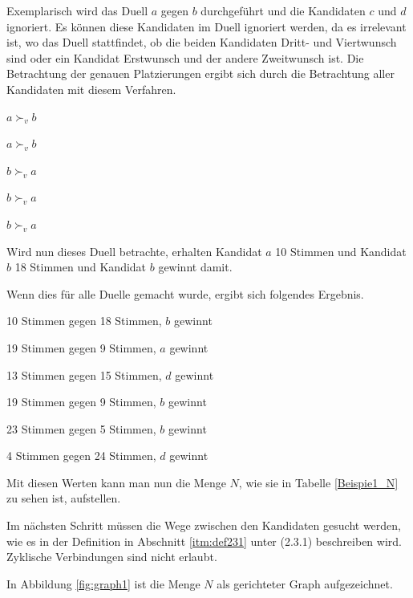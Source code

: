 Exemplarisch wird das Duell $a$ gegen $b$ durchgeführt und die Kandidaten $c$ und $d$ ignoriert. Es können diese Kandidaten im Duell ignoriert werden, da es irrelevant ist, wo das Duell stattfindet, ob die beiden Kandidaten Dritt- und Viertwunsch sind oder ein Kandidat Erstwunsch und der andere Zweitwunsch ist. Die Betrachtung der genauen Platzierungen ergibt sich durch die Betrachtung aller Kandidaten mit diesem Verfahren.

\begin{description}
\centering
\item[6 mal] $a \succ_{v} b$
\item[4 mal] $a \succ_{v} b$
\item[10 mal] $b \succ_{v} a$
\item[3 mal] $b \succ_{v} a$
\item[5 mal] $b \succ_{v}a$
\end{description}

Wird nun dieses Duell betrachte, erhalten Kandidat $a$ 10 Stimmen und Kandidat $b$ 18 Stimmen und Kandidat $b$ gewinnt damit.


Wenn dies für alle Duelle gemacht wurde, ergibt sich folgendes Ergebnis.
 \begin{description}
 \centering
 \item[$a$ vs. $b$] 10 Stimmen gegen 18 Stimmen, $b$ gewinnt
 \item[$a$ vs. $c$] 19 Stimmen gegen 9 Stimmen, $a$ gewinnt
 \item[$a$ vs. $d$] 13 Stimmen gegen 15 Stimmen, $d$ gewinnt
 \item[$b$ vs. $c$] 19 Stimmen gegen 9 Stimmen, $b$ gewinnt
 \item[$b$ vs. $d$] 23 Stimmen gegen 5 Stimmen, $b$ gewinnt
 \item[$c$ vs. $d$] 4 Stimmen gegen 24 Stimmen, $d$ gewinnt
 \end{description}
 
 Mit diesen Werten kann man nun die Menge $N$, wie sie in Tabelle \ref{Beispie1_N} zu sehen ist, aufstellen.



Im nächsten Schritt müssen die Wege zwischen den Kandidaten gesucht werden, wie es in der Definition in Abschnitt \ref{itm:def231} unter (2.3.1) beschreiben wird. Zyklische Verbindungen sind nicht erlaubt.

In Abbildung \ref{fig:graph1} ist die Menge $N$ als gerichteter Graph aufgezeichnet.

